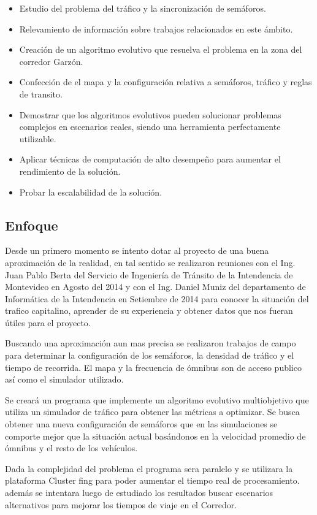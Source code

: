 \begin{itemize}
	\item Estudio del problema del tráfico y la sincronización de semáforos.
	\item Relevamiento de información sobre trabajos relacionados en este ámbito.
	\item Creación de un algoritmo evolutivo que resuelva el problema en la zona del corredor Garzón.
	\item Confección de el mapa y la configuración relativa a semáforos, tráfico y reglas de transito.	
	\item Demostrar que los algoritmos evolutivos pueden solucionar problemas complejos en escenarios  reales, siendo una herramienta perfectamente utilizable.
	\item Aplicar técnicas de computación de alto desempeño para aumentar el rendimiento de la solución.
	\item Probar la escalabilidad de la solución.
\end{itemize}

 
\subsection{Enfoque}

Desde un primero momento se intento dotar al proyecto de una buena aproximación de la realidad, en tal sentido se realizaron reuniones con el Ing. Juan Pablo Berta del Servicio de Ingeniería de Tránsito de la Intendencia de Montevideo en Agosto del  2014 y con el Ing. Daniel Muniz del departamento de Informática de la Intendencia en Setiembre de 2014 para conocer la situación del trafico capitalino, aprender de su experiencia y obtener datos que nos fueran útiles para el proyecto.


Buscando una aproximación aun mas precisa se realizaron trabajos de campo para determinar la configuración de los semáforos, la densidad de tráfico y el tiempo de recorrida. El mapa y la frecuencia de ómnibus son de acceso publico así como el simulador utilizado.

Se creará un programa que implemente un algoritmo evolutivo multiobjetivo que utiliza un simulador de tráfico para obtener las métricas a optimizar. Se busca obtener una nueva configuración de semáforos que en las simulaciones se comporte mejor que la situación actual basándonos en la velocidad promedio de ómnibus y el resto de los vehículos.

Dada la complejidad del problema el programa sera paralelo y se utilizara la plataforma Cluster fing para poder aumentar el tiempo real de procesamiento. además se intentara luego de estudiado los resultados buscar escenarios alternativos para mejorar los tiempos de viaje en el Corredor.

